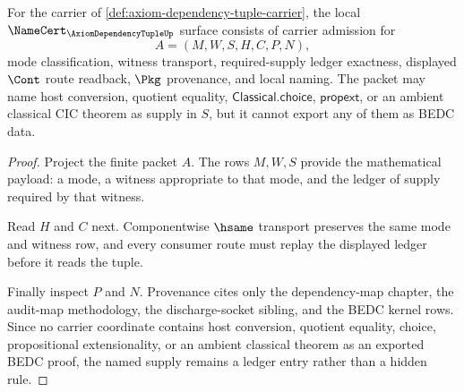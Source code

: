 \begin{theorem}
\label{thm:axiom-dependency-tuple-namecert-obligations}
For the carrier of \autoref{def:axiom-dependency-tuple-carrier}, the local
$\NameCert_{\AxiomDependencyTupleUp}$ surface consists of carrier admission
for
$$
A=(M,W,S,H,C,P,N),
$$
mode classification, witness transport, required-supply ledger exactness,
displayed $\Cont$ route readback, $\Pkg$ provenance, and local naming. The
packet may name host conversion, quotient equality,
$\mathsf{Classical.choice}$, $\mathsf{propext}$, or an ambient classical CIC
theorem as supply in $S$, but it cannot export any of them as BEDC data.
\end{theorem}
\begin{proof}
Project the finite packet $A$. The rows $M,W,S$ provide the mathematical
payload: a mode, a witness appropriate to that mode, and the ledger of supply
required by that witness.

Read $H$ and $C$ next. Componentwise $\hsame$ transport preserves the same
mode and witness row, and every consumer route must replay the displayed
ledger before it reads the tuple.

Finally inspect $P$ and $N$. Provenance cites only the dependency-map chapter,
the audit-map methodology, the discharge-socket sibling, and the BEDC kernel
rows. Since no carrier coordinate contains host conversion, quotient equality,
choice, propositional extensionality, or an ambient classical theorem as an
exported BEDC proof, the named supply remains a ledger entry rather than a
hidden rule.
\end{proof}

